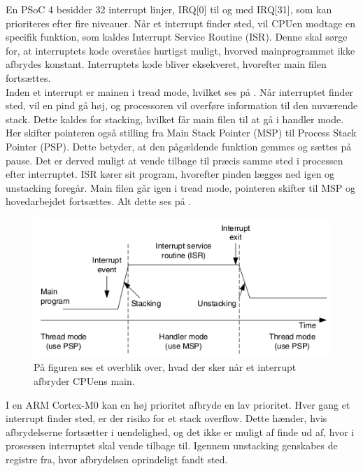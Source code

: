 En PSoC 4 besidder 32 interrupt linjer, IRQ[0] til og med IRQ[31], som kan prioriteres efter fire niveauer. %
Når et interrupt finder sted, vil CPUen modtage en specifik funktion, som kaldes Interrupt Service Routine (ISR). Denne skal sørge for, at interruptets kode overståes hurtigst muligt, hvorved mainprogrammet ikke afbrydes konstant. Interruptets kode bliver eksekveret, hvorefter main filen fortsættes. \citep{Badiger2016}\\
Inden et interrupt er mainen i tread mode, hvilket ses på . Når interruptet finder sted, vil en pind gå høj, og processoren vil overføre information til den nuværende stack. Dette kaldes for stacking, hvilket får main filen til at gå i handler mode. Her skifter pointeren også stilling fra Main Stack Pointer (MSP) til Process Stack Pointer (PSP). Dette betyder, at den pågældende funktion gemmes og sættes på pause. Det er derved muligt at vende tilbage til præcis samme sted i processen efter interruptet. ISR kører sit program, hvorefter pinden lægges ned igen og unstacking foregår. Main filen går igen i tread mode, pointeren skifter til MSP og hovedarbejdet fortsættes. Alt dette ses på . \citep{Badiger2016,Tanenbaum2006}
\begin{figure}[H]
	\centering
	\includegraphics[scale=0.68]{figures/bProblemloesning/interrupt.png}
	\caption{På figuren ses et overblik over, hvad der sker når et interrupt afbryder CPUens main. \citep{Tanenbaum2006}}
	\label{fig:interrupt}
\end{figure}\vspace{-0.5cm}
I en ARM Cortex-M0 kan en høj prioritet afbryde en lav prioritet. Hver gang et interrupt finder sted, er der risiko for et stack overflow. Dette hænder, hvis afbrydelserne fortsætter i uendelighed, og det ikke er muligt af finde ud af, hvor i prosessen interruptet skal vende tilbage til. %
Igennem unstacking genskabes de registre fra, hvor afbrydelsen oprindeligt fandt sted. \citep{Badiger2016}

